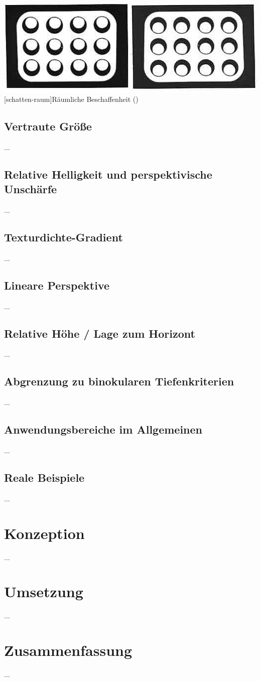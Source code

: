 \vspace{1em}
\begin{minipage}{\linewidth}
	\centering
	\includegraphics[width=0.7\linewidth]{images/schatten01.jpg}
	[schatten-raum]{Räumliche Beschaffenheit (\cite{heidXX})}
	\label{fig:schatten-raum}
\end{minipage}
\vspace{1em} 

\subsection{Vertraute Größe}
...

\subsection{Relative Helligkeit und perspektivische Unschärfe}
...

\subsection{Texturdichte-Gradient}
...

\subsection{Lineare Perspektive}
...

\subsection{Relative Höhe / Lage zum Horizont}
...

\subsection{Abgrenzung zu binokularen Tiefenkriterien}
...

\subsection{Anwendungsbereiche im Allgemeinen}
...

\subsection{Reale Beispiele}
...

\section{Konzeption}
...

\section{Umsetzung}
...

\section{Zusammenfassung}
...